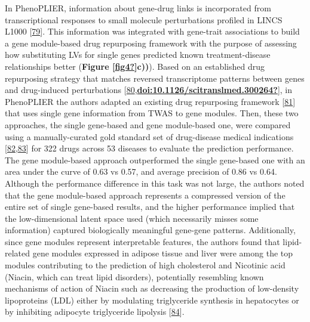 In PhenoPLIER, information about gene-drug links is incorporated from transcriptional responses to small molecule perturbations profiled in LINCS L1000 {[}\protect\hyperlink{ref-F7lIlh2N}{79}{]}.
This information was integrated with gene-trait associations to build a gene module-based drug repurposing framework with the purpose of assessing how substituting LVs for single genes predicted known treatment-disease relationships better (\textbf{Figure {[}\protect\hyperlink{ref-fig4}{\textbf{fig4?}}{]}c))}).
Based on an established drug repurposing strategy that matches reversed transcriptome patterns between genes and drug-induced perturbations {[}\protect\hyperlink{ref-mZjkE1xU}{80},\protect\hyperlink{ref-doi:10.1126ux2fscitranslmed.300264}{\textbf{doi:10.1126/scitranslmed.300264?}}{]}, in PhenoPLIER the authors adapted an existing drug repurposing framework {[}\protect\hyperlink{ref-17oeJ0CXy}{81}{]} that uses single gene information from TWAS to gene modules.
Then, these two approaches, the single gene-based and gene module-based one, were compared using a manually-curated gold standard set of drug-disease medical indications {[}\protect\hyperlink{ref-O21tn8vf}{82},\protect\hyperlink{ref-10KA5jTBQ}{83}{]} for 322 drugs across 53 diseases to evaluate the prediction performance.
The gene module-based approach outperformed the single gene-based one with an area under the curve of 0.63 vs 0.57, and average precision of 0.86 vs 0.64.
Although the performance difference in this task was not large, the authors noted that the gene module-based approach represents a compressed version of the entire set of single gene-based results, and the higher performance implied that the low-dimensional latent space used (which necessarily misses some information) captured biologically meaningful gene-gene patterns.
Additionally, since gene modules represent interpretable features, the authors found that lipid-related gene modules expressed in adipose tissue and liver were among the top modules contributing to the prediction of high cholesterol and Nicotinic acid (Niacin, which can treat lipid disorders), potentially resembling known mechanisms of action of Niacin such as decreasing the production of low-density lipoproteins (LDL) either by modulating triglyceride synthesis in hepatocytes or by inhibiting adipocyte triglyceride lipolysis {[}\protect\hyperlink{ref-LVihFr3g}{84}{]}.

